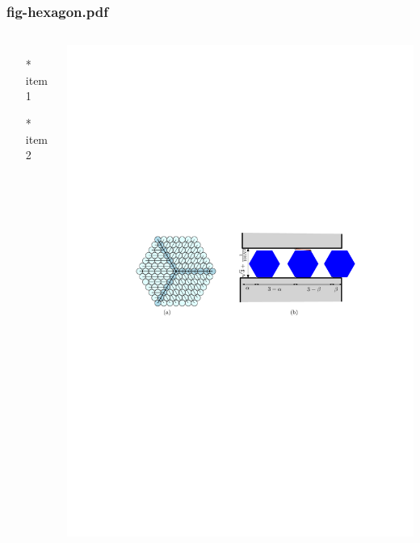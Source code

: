 \begin{frame} \frametitle{fig-hexagon.pdf}
    \begin{columns}[c]
        \begin{itemize}
            \item[*] item 1
            \item[*] item 2
        \end{itemize}
        \begin{minipage}{\linewidth}
            \begin{center}
            \includegraphics[width=.9\textwidth]{graphics/fig-hexagon.pdf}
            \label{gfx:fig-hexagon.pdf}
            \end{center}
        \end{minipage}
    \end{columns}
\end{frame}
